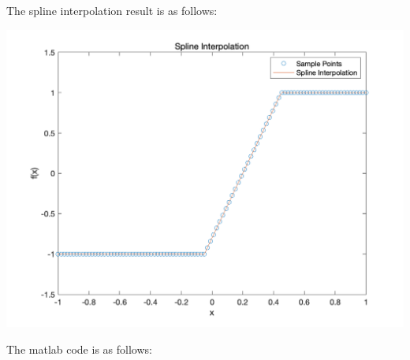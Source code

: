 \documentclass{article}
\begin{document}
The spline interpolation result is as follows:\\
\begin{center}
\includegraphics[scale=0.4]{spline_interpolation.png}
\end{center}
The matlab code is as follows:
\end{document}
